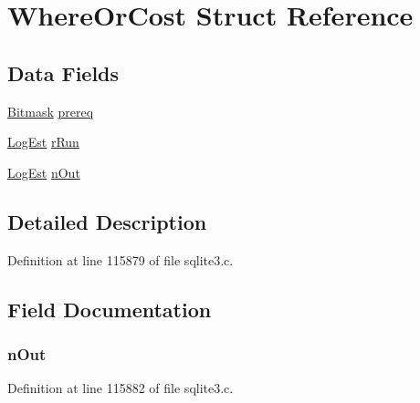 \hypertarget{struct_where_or_cost}{}\section{Where\+Or\+Cost Struct Reference}
\label{struct_where_or_cost}
\subsection*{Data Fields}
\begin{DoxyCompactItemize}
\item 
\hyperlink{sqlite3_8c_afa77b629897c4457bfdc47d364ba5c3f}{Bitmask} \hyperlink{struct_where_or_cost_aae7565677c852f3ea5f63a3d5fae63a7}{prereq}
\item 
\hyperlink{sqlite3_8c_aa0f9b3b63ad120ac15b96785b05ce733}{Log\+Est} \hyperlink{struct_where_or_cost_a19a591aa81312e9d7f3e26df94f10abe}{r\+Run}
\item 
\hyperlink{sqlite3_8c_aa0f9b3b63ad120ac15b96785b05ce733}{Log\+Est} \hyperlink{struct_where_or_cost_a0aa5ee9015b877549b7fceef6a0e81c5}{n\+Out}
\end{DoxyCompactItemize}


\subsection{Detailed Description}


Definition at line 115879 of file sqlite3.\+c.



\subsection{Field Documentation}
\hypertarget{struct_where_or_cost_a0aa5ee9015b877549b7fceef6a0e81c5}{}
\subsubsection[{n\+Out}]{ n\+Out}\label{struct_where_or_cost_a0aa5ee9015b877549b7fceef6a0e81c5}


Definition at line 115882 of file sqlite3.\+c.

\hypertarget{struct_where_or_cost_aae7565677c852f3ea5f63a3d5fae63a7}{}
